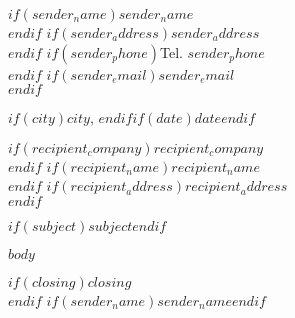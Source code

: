 \documentclass[11pt,a4paper]{article}
\begin{document}
$if(sender_name)$\textbf{$sender_name$}\\$endif$
$if(sender_address)$$sender_address$\\$endif$
$if(sender_phone)$Tel. $sender_phone$\\$endif$
$if(sender_email)$\href{mailto:$sender_email$}{$sender_email$}\\$endif$

\vspace{12pt}

$if(city)$$city$, $endif$$if(date)$$date$$endif$

\vspace{12pt}

$if(recipient_company)$\textbf{$recipient_company$}\\$endif$
$if(recipient_name)$$recipient_name$\\$endif$
$if(recipient_address)$$recipient_address$\\$endif$

\vspace{18pt}

$if(subject)$\textbf{$subject$}$endif$

\vspace{12pt}

$body$

\vspace{18pt}

$if(closing)$$closing$\\$endif$
$if(sender_name)$$sender_name$$endif$
\end{document}
